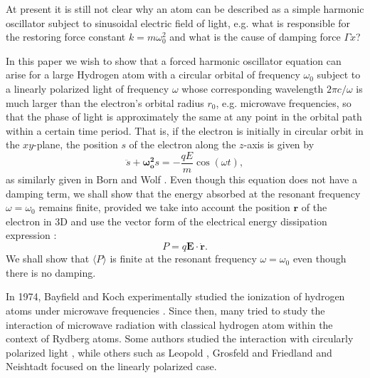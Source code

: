 \documentclass[twocolumn,showpacs,preprintnumbers,amsmath,amssymb]{revtex4}
\begin{document}
At present it is still not clear why an atom can be described as a simple harmonic oscillator subject to sinusoidal electric field of light, e.g. what is  responsible for the restoring force constant $k = m\omega^2_0$ and what is the cause of damping force $\Gamma\dot{x}$? 

In this paper we wish to show that a forced harmonic oscillator equation can arise for a large Hydrogen atom 
with a circular orbital of frequency $\omega_0$ subject to a linearly polarized light of frequency $\omega$ whose corresponding wavelength $2\pi c/\omega$ is much larger than the electron's orbital radius $r_0$, e.g. microwave frequencies, so that the phase of light is approximately the same at any point in the orbital path within a certain time period. That is, if the electron is initially in circular orbit in the $xy$-plane, the position $s$ of the electron along the $z$-axis is given by 
\begin{equation} \label{harmonicequation}
\ddot{s}+\bm{\omega_{o}^{2}}s=-\frac{qE}{m}\cos\left(\omega t\right),
\end{equation} 
as similarly given in Born and Wolf \cite{BornandWolfp91}. Even though this equation does not have a damping term, we shall show that the energy absorbed at the resonant frequency $\omega=\omega_0$ remains finite, provided we take into account the position $\mathbf{r}$ of the electron in 3D and use the vector form of the electrical energy dissipation expression \cite{Jackson}: 
\begin{equation}
P = q\mathbf{E}\cdot\mathbf{\dot{r}}.
\end{equation}
We shall show that $\langle P \rangle $ is finite at the resonant frequency $\omega = \omega_0$ even though there is no damping.


In 1974, Bayfield and Koch experimentally studied the ionization of hydrogen atoms under microwave frequencies \cite{Bayfield}. Since then, many tried to study the interaction of microwave radiation with classical hydrogen atom within the context of Rydberg atoms.\cite{hanken} 
Some authors studied the interaction with circularly polarized light \cite{Cole, Brunello, Farelly, JGriffiths, Gajda}, while others such as Leopold \cite{Leopold}, Grosfeld and Friedland \cite{Friedland} and Neishtadt \cite{Neishtadt} focused on the linearly polarized case.
\end{document}
